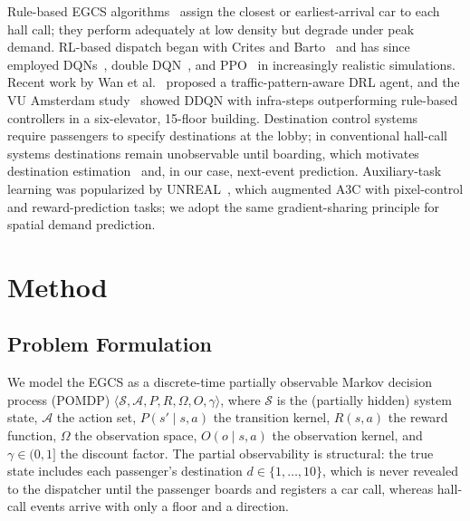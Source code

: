 \documentclass{IEEEcsmag}
\begin{document}
Rule-based EGCS algorithms~\cite{barney2003elevator,siikonen1997elevator}
assign the closest or earliest-arrival car to each hall call; they
perform adequately at low density but degrade under peak demand.
RL-based dispatch began with Crites and Barto~\cite{crites1998elevator}
and has since employed DQNs~\cite{mnih2015dqn}, double
DQN~\cite{van2016deep}, and PPO~\cite{schulman2017ppo} in
increasingly realistic simulations. Recent work by Wan et
al.~\cite{wan2024traffic} proposed a traffic-pattern-aware DRL agent,
and the VU Amsterdam study~\cite{vu2025rl} showed DDQN with
infra-steps outperforming rule-based controllers in a
six-elevator, 15-floor building. Destination control
systems~\cite{sorsa2022destination,ruokokoski2016assignment} require
passengers to specify destinations at the lobby; in conventional
hall-call systems destinations remain unobservable until boarding,
which motivates destination estimation~\cite{chen2021matrix} and,
in our case, next-event prediction. Auxiliary-task learning was
popularized by UNREAL~\cite{jaderberg2017unreal}, which augmented A3C
with pixel-control and reward-prediction tasks; we adopt the same
gradient-sharing principle for spatial demand prediction.
\section{Method}
\label{sec:method}

\subsection{Problem Formulation}

We model the EGCS as a discrete-time partially observable Markov
decision process (POMDP) $\langle \mathcal{S}, \mathcal{A}, P, R,
\Omega, O, \gamma \rangle$, where $\mathcal{S}$ is the (partially
hidden) system state, $\mathcal{A}$ the action set, $P(s' \mid s, a)$
the transition kernel, $R(s, a)$ the reward function, $\Omega$ the
observation space, $O(o \mid s, a)$ the observation kernel, and
$\gamma \in (0, 1]$ the discount factor. The partial observability
is structural: the true state includes each passenger's destination
$d \in \{1, \dots, 10\}$, which is never revealed to the dispatcher
until the passenger boards and registers a car call, whereas
hall-call events arrive with only a floor and a direction.
\end{document}
